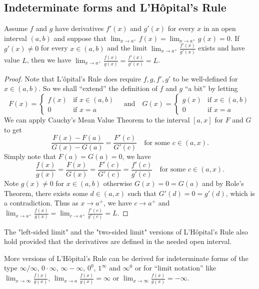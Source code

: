 \documentclass[a4paper]{ctexart}
\begin{document}
        \subsection{Indeterminate forms and L'Hôpital's Rule}
        \begin{mythm}
            Assume $f$ and $g$ have derivatives $f'(x)$ and $g'(x)$ for every $x$ in an open interval $(a,b)$ and suppose that $\displaystyle \lim_{x\to a^+} f(x) = \lim_{x\to a^+} g(x) = 0$. If $g'(x) \neq 0$ for every $x\in (a,b)$ and the limit $\displaystyle \lim_{x\to a^+} \frac{f'(x)}{g'(x)}$ exists and have value $L$, then we have $\displaystyle \lim_{x\to a^+} \frac{f(x)}{g(x)} = \frac{f'(x)}{g'(x)} = L$.
        \end{mythm}
        \begin{proof}
            Note that L'ôpital's Rule does require $f,g,f',g'$ to be well-defined for $x\in (a,b)$. So we shall ``extend'' the definition of $f$ and $g$ ``a bit'' by letting
            \[
            F(x) = \begin{cases}
            f(x) & \text{if } x\in (a,b)\\
            0 & \text{if } x=a
            \end{cases}
            \quad \text{and} \quad
            G(x) = \begin{cases}
            g(x) & \text{if } x\in (a,b)\\
            0 & \text{if } x=a
            \end{cases}
            \]
            We can apply Cauchy's Mean Value Theorem to the interval $[a,x]$ for $F$ and $G$ to get
            \[
            \frac{F(x) - F(a)}{G(x) - G(a)} = \frac{F'(c)}{G'(c)} \quad \text{for some } c\in (a,x).
            \]
            Simply note that $F(a) = G(a) = 0$, we have
            \[
            \frac{f(x)}{g(x)} = \frac{F(x)}{G(x)} = \frac{F'(c)}{G'(c)} = \frac{f'(c)}{g'(c)} \quad \text{for some } c\in (a,x).
            \]
            Note $g(x) \neq 0$ for $x\in (a,b)$ otherwise $G(x) = 0 = G(a)$ and by Role's Theorem, there exists some $d\in (a,x)$ such that $G'(d) = 0 = g'(d)$, which is a contradiction. Thus as $x\to a^+$, we have $c\to a^+$ and $\displaystyle \lim_{x\to a^+} \frac{f(x)}{g(x)} = \lim_{c\to a^+} \frac{f'(c)}{g'(c)} = L$.
        \end{proof}
        \begin{myrmk}
            The "left-sided limit" and the "two-sided limit" versions of L'Hôpital's Rule also hold provided that the derivatives are defined in the needed open interval.
            
            More versions of L'Hôpital's Rule can be derived for indeterminate forms of the type $\infty/\infty$, $0\cdot \infty$, $\infty - \infty$, $0^0$, $1^\infty$ and $\infty^0$ or for ``limit notation'' like $\displaystyle \lim_{x\to \infty } \frac{f(x)}{g(x)}$, $\displaystyle \lim_{x\to a} \frac{f(x)}{g(x)} = \infty$ or $\displaystyle \lim_{x\to \infty} \frac{f(x)}{g(x)} = -\infty$.
        \end{myrmk}
\end{document}
